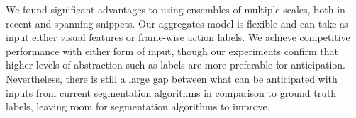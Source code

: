\documentclass[runningheads]{llncs}
\begin{document}
We found significant advantages to using ensembles of multiple scales, both in recent and spanning snippets.  Our aggregates model is flexible and can take as input either visual features or frame-wise action labels.  We achieve competitive performance with either form of input, though our experiments confirm that higher levels of abstraction such as labels are more preferable for anticipation.  Nevertheless, there is still a large gap between what can be anticipated with inputs from current segmentation algorithms in comparison to ground truth labels, leaving room for segmentation algorithms to improve.\\ 

\clearpage 


\end{document}
